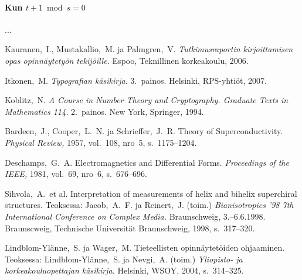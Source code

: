 \documentclass[finnish, 12pt, a4paper, sci, utf8, pdfa]{aaltothesis}
\begin{document}
\paragraph{Kun $ t + 1 \bmod s = 0 $}

...

\clearpage

\thesisbibliography

\begin{thebibliography}{99}

 Kauranen,\ I., Mustakallio,\ M. ja Palmgren,\ V.
  \textit{Tutkimusraportin kirjoittamisen opas opinnäytetyön
    tekijöille.}  Espoo, Teknillinen korkeakoulu, 2006.

 Itkonen,\ M. \textit{Typografian käsikirja.} 3.\
  painos.  Helsinki, RPS-yhtiöt, 2007.

 Koblitz,\ N. \textit{A Course in Number Theory and
    Cryptography. Graduate Texts in Mathematics 114.}  2.\ painos. New
  York, Springer, 1994.

\bibitem{bcs} Bardeen,\ J., Cooper,\ L.\ N. ja Schrieffer,\ J.\ R.
  Theory of Superconductivity. \textit{Physical Review,} 1957, vol.\
  108, nro~5, s.\ 1175--1204.

 Deschamps,\ G.\ A. Electromagnetics and
  Differential Forms. \textit{Proceedings of the IEEE,} 1981, vol.\
  69, nro~6, s.\ 676--696.

\bibitem{Sihvola} Sihvola,\ A.\ et al.
  \foreignlanguage{english}{Interpretation of measurements of helix 
    and bihelix superchiral structures.}
  Teoksessa: Jacob,\ A.\ F. ja
  Reinert,\ J. (toim.) \textit{Bianisotropics '98 7th International
    Conference on Complex Media.}  Braunschweig, 3.--6.6.1998.
  Braunscweig, Technische Universität Braunschweig, 1998, s.\
  317--320.

 Lindblom-Ylänne,\ S. ja Wager,\ M.  Tieteellisten
  opinnäytetöiden ohjaaminen. Teoksessa: Lindblom-Ylänne,\ S. ja
  Nevgi,\ A. (toim.) \textit{Yliopisto- ja korkeakouluopettajan
    käsikirja.}  Helsinki, WSOY, 2004, s.\ 314--325.
 

\end{thebibliography}
\end{document}
